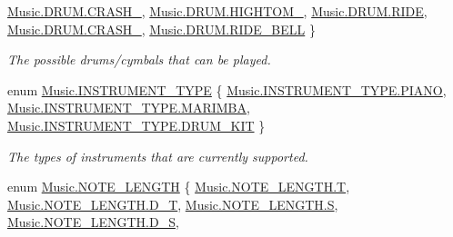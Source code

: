 \begin{DoxyCompactItemize}
\hyperlink{group___music_enums_ggade475b4382c7066d1af13e7c13c029b6a5cc345cd6dde1f871f706f00b8d3389e}{Music.\+D\+R\+U\+M.\+C\+R\+A\+S\+H\+\_}, 
\hyperlink{group___music_enums_ggade475b4382c7066d1af13e7c13c029b6aea2fc79b38ff3fc96f9ee77f6a05eb78}{Music.\+D\+R\+U\+M.\+H\+I\+G\+H\+T\+O\+M\+\_}, 
\hyperlink{group___music_enums_ggade475b4382c7066d1af13e7c13c029b6a82def663d0a5065e52c86a3d9f462054}{Music.\+D\+R\+U\+M.\+R\+I\+DE}, 
\hyperlink{group___music_enums_ggade475b4382c7066d1af13e7c13c029b6ab22cbce9616b64f3a24f5df4b81c178f}{Music.\+D\+R\+U\+M.\+C\+R\+A\+S\+H\+\_}, 
\hyperlink{group___music_enums_ggade475b4382c7066d1af13e7c13c029b6a2259a8afe41c9293034e327a24a550bd}{Music.\+D\+R\+U\+M.\+R\+I\+D\+E\+\_\+\+B\+E\+LL}
 \}\begin{DoxyCompactList}\small\item\em The possible drums/cymbals that can be played. \end{DoxyCompactList}
\item 
enum \hyperlink{group___music_enums_gabfce60192305965558a36e368ebd67c3}{Music.\+I\+N\+S\+T\+R\+U\+M\+E\+N\+T\+\_\+\+T\+Y\+PE} \{ \hyperlink{group___music_enums_ggabfce60192305965558a36e368ebd67c3aef6dcf375679288e8fe520ec07f29130}{Music.\+I\+N\+S\+T\+R\+U\+M\+E\+N\+T\+\_\+\+T\+Y\+P\+E.\+P\+I\+A\+NO}, 
\hyperlink{group___music_enums_ggabfce60192305965558a36e368ebd67c3ae84dbd9f12bf5278bfa76a692e42f50f}{Music.\+I\+N\+S\+T\+R\+U\+M\+E\+N\+T\+\_\+\+T\+Y\+P\+E.\+M\+A\+R\+I\+M\+BA}, 
\hyperlink{group___music_enums_ggabfce60192305965558a36e368ebd67c3aceaaf30d57fed4b1c3f4b95c60a76df6}{Music.\+I\+N\+S\+T\+R\+U\+M\+E\+N\+T\+\_\+\+T\+Y\+P\+E.\+D\+R\+U\+M\+\_\+\+K\+IT}
 \}\begin{DoxyCompactList}\small\item\em The types of instruments that are currently supported. \end{DoxyCompactList}
\item 
enum \hyperlink{group___music_enums_gaf11b5f079adbb21c800b9eca1c5c3cbd}{Music.\+N\+O\+T\+E\+\_\+\+L\+E\+N\+G\+TH} \{ \newline
\hyperlink{group___music_enums_ggaf11b5f079adbb21c800b9eca1c5c3cbdab9ece18c950afbfa6b0fdbfa4ff731d3}{Music.\+N\+O\+T\+E\+\_\+\+L\+E\+N\+G\+T\+H.\+T}, 
\hyperlink{group___music_enums_ggaf11b5f079adbb21c800b9eca1c5c3cbda5965eb90b97091e4c04c3e63c8cadc82}{Music.\+N\+O\+T\+E\+\_\+\+L\+E\+N\+G\+T\+H.\+D\+\_\+T}, 
\hyperlink{group___music_enums_ggaf11b5f079adbb21c800b9eca1c5c3cbda5dbc98dcc983a70728bd082d1a47546e}{Music.\+N\+O\+T\+E\+\_\+\+L\+E\+N\+G\+T\+H.\+S}, 
\hyperlink{group___music_enums_ggaf11b5f079adbb21c800b9eca1c5c3cbda99bc05b985a6557303572f10feeb65e8}{Music.\+N\+O\+T\+E\+\_\+\+L\+E\+N\+G\+T\+H.\+D\+\_\+S}, 

\end{DoxyCompactItemize}
